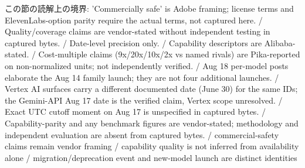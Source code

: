 \begin{claimboundary}[読解上の境界]
この節の読解上の境界: 'Commercially safe' is Adobe framing; license terms and ElevenLabs-option parity require the actual terms, not captured here. / Quality/coverage claims are vendor-stated without independent testing in captured bytes. / Date-level precision only. / Capability descriptors are Alibaba-stated. / Cost-multiple claims (9x/20x/10x/2x vs named rivals) are Pika-reported on non-normalized units; not independently verified. / Aug 18 per-model posts elaborate the Aug 14 family launch; they are not four additional launches. / Vertex AI surfaces carry a different documented date (June 30) for the same IDs; the Gemini-API Aug 17 date is the verified claim, Vertex scope unresolved. / Exact UTC cutoff moment on Aug 17 is unspecified in captured bytes. / Capability-parity and any benchmark figures are vendor-stated; methodology and independent evaluation are absent from captured bytes. / commercial-safety claims remain vendor framing / capability quality is not inferred from availability alone / migration/deprecation event and new-model launch are distinct identities
\end{claimboundary}
